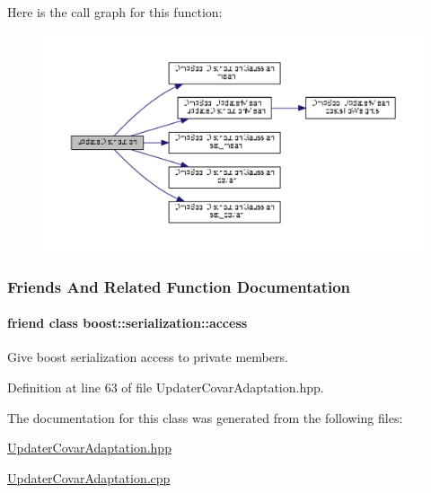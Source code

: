 Here is the call graph for this function\+:
\nopagebreak
\begin{figure}[H]
\begin{center}
\leavevmode
\includegraphics[width=350pt]{classDmpBbo_1_1UpdaterCovarAdaptation_aabb65aaf08049416ed18b294d5fca415_cgraph}
\end{center}
\end{figure}




\subsubsection{Friends And Related Function Documentation}
\hypertarget{classDmpBbo_1_1UpdaterCovarAdaptation_ac98d07dd8f7b70e16ccb9a01abf56b9c}{
\paragraph[{boost\+::serialization\+::access}]{\setlength{\rightskip}{0pt plus 5cm}friend class boost\+::serialization\+::access\hspace{0.3cm}{\ttfamily [friend]}}}\label{classDmpBbo_1_1UpdaterCovarAdaptation_ac98d07dd8f7b70e16ccb9a01abf56b9c}


Give boost serialization access to private members. 



Definition at line 63 of file Updater\+Covar\+Adaptation.\+hpp.



The documentation for this class was generated from the following files\+:\begin{DoxyCompactItemize}
\item 
\hyperlink{UpdaterCovarAdaptation_8hpp}{Updater\+Covar\+Adaptation.\+hpp}\item 
\hyperlink{UpdaterCovarAdaptation_8cpp}{Updater\+Covar\+Adaptation.\+cpp}\end{DoxyCompactItemize}
